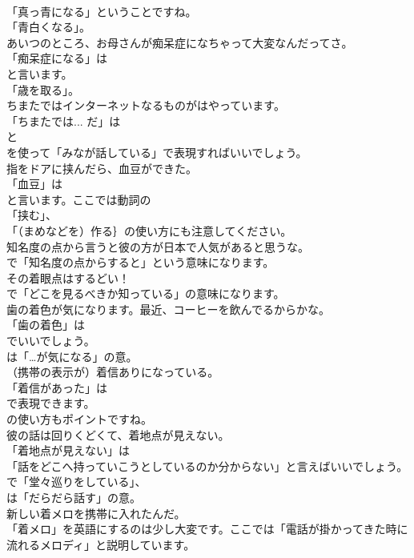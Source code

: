 \documentclass[8pt]{extreport}
\begin{document}
\begin{CJK}{UTF8}{min}
\\	「真っ青になる」ということですね。
\\	「青白くなる」。	
\\	あいつのところ、お母さんが痴呆症になちゃって大変なんだってさ。 
\\	「痴呆症になる」は
\\	と言います。
\\	「歳を取る」。	
\\	ちまたではインターネットなるものがはやっています。 
\\	「ちまたでは... だ」は
\\	と
\\	を使って「みなが話している」で表現すればいいでしょう。	
\\	指をドアに挟んだら、血豆ができた。 
\\	「血豆」は
\\	と言います。ここでは動詞の
\\	「挟む」、
\\	「（まめなどを）作る｝の使い方にも注意してください。	
\\	知名度の点から言うと彼の方が日本で人気があると思うな。 
\\	で「知名度の点からすると」という意味になります。	
\\	その着眼点はするどい！ 
\\	で「どこを見るべきか知っている」の意味になります。	
\\	歯の着色が気になります。最近、コーヒーを飲んでるからかな。 
\\	「歯の着色」は 
\\	でいいでしょう。
\\	は「…が気になる」の意。	
\\	（携帯の表示が）着信ありになっている。 
\\	「着信があった」は
\\	で表現できます。
\\	の使い方もポイントですね。	
\\	彼の話は回りくどくて、着地点が見えない。 
\\	「着地点が見えない」は
\\	「話をどこへ持っていこうとしているのか分からない」と言えばいいでしょう。
\\	で「堂々巡りをしている」、
\\	は「だらだら話す」の意。	
\\	新しい着メロを携帯に入れたんだ。 
\\	「着メロ」を英語にするのは少し大変です。ここでは「電話が掛かってきた時に流れるメロディ」と説明しています。	

\end{CJK}
\end{document}
